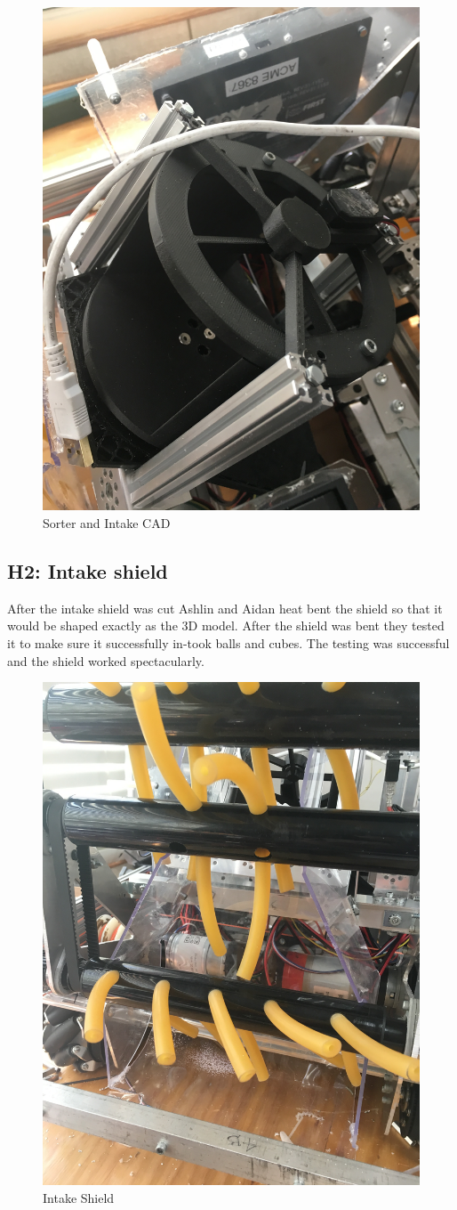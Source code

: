 \documentclass{article}
\begin{document}
\begin{figure}
    \centering
    \includegraphics[width=.6 \textwidth, angle=270 ]{10_11-05/images/sorter.JPG}
    \caption{Sorter and Intake CAD}
    \label{fig:Intake CAD}
\end{figure}

\subsection{H2: Intake shield}

After the intake shield was cut Ashlin and Aidan heat bent the shield so that it would be shaped exactly as the 3D model. After the shield was bent they tested it to make sure it successfully in-took balls and cubes. The testing was successful and the shield worked  spectacularly.

\begin{figure}
    \centering
    \includegraphics[width=.6\textwidth, angle=270]{10_11-05/images/intake_shield.JPG}
    \caption{Intake Shield}
    \label{fig:Intake Shield}
\end{figure}
\end{document}
